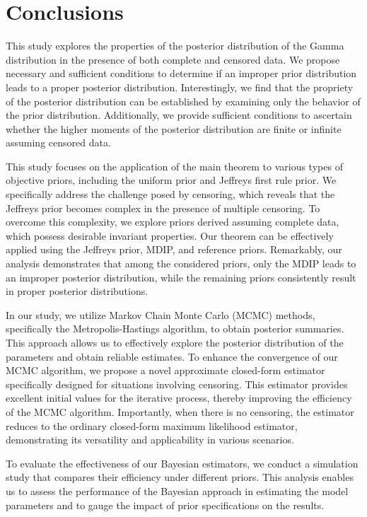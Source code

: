 \section{Conclusions}\label{sec:6}

This study explores the properties of the posterior distribution of the Gamma distribution in the presence of both complete and censored data. We propose necessary and sufficient conditions to determine if an improper prior distribution leads to a proper posterior distribution. Interestingly, we find that the propriety of the posterior distribution can be established by examining only the behavior of the prior distribution. Additionally, we provide sufficient conditions to ascertain whether the higher moments of the posterior distribution are finite or infinite assuming censored data.

This study focuses on the application of the main theorem to various types of objective priors, including the uniform prior and Jeffreys first rule prior. We specifically address the challenge posed by censoring, which reveals that the Jeffreys prior becomes complex in the presence of multiple censoring. To overcome this complexity, we explore priors derived assuming complete data, which possess desirable invariant properties. Our theorem can be effectively applied using the Jeffreys prior, MDIP, and reference priors. Remarkably, our analysis demonstrates that among the considered priors, only the MDIP leads to an improper posterior distribution, while the remaining priors consistently result in proper posterior distributions.

In our study, we utilize Markov Chain Monte Carlo (MCMC) methods, specifically the Metropolis-Hastings algorithm, to obtain posterior summaries. This approach allows us to effectively explore the posterior distribution of the parameters and obtain reliable estimates. To enhance the convergence of our MCMC algorithm, we propose a novel approximate closed-form estimator specifically designed for situations involving censoring. This estimator provides excellent initial values for the iterative process, thereby improving the efficiency of the MCMC algorithm. Importantly, when there is no censoring, the estimator reduces to the ordinary closed-form maximum likelihood estimator, demonstrating its versatility and applicability in various scenarios.

To evaluate the effectiveness of our Bayesian estimators, we conduct a simulation study that compares their efficiency under different priors. This analysis enables us to assess the performance of the Bayesian approach in estimating the model parameters and to gauge the impact of prior specifications on the results.


